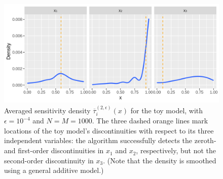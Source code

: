 \documentclass[12pt]{article}
\begin{document}
\begin{figure}
    \centering
    \includegraphics[width=1.00\linewidth]{figures/toy-taubar.png}
    \caption{Averaged sensitivity density $\overline{\tau}_i^{(2,\epsilon)}(x)$ for the toy model, with $\epsilon = 10^{-4}$ and $N = M = 1000$. The three dashed orange lines mark locations of the toy model's discontinuities with respect to its three independent variables: the algorithm successfully detects the zeroth- and first-order discontinuities in $x_1$ and $x_2$, respectively, but not the second-order discontinuity in $x_3$. (Note that the density is smoothed using a general additive model.)}
    \label{fig:toy-taubar}
\end{figure}
\end{document}
